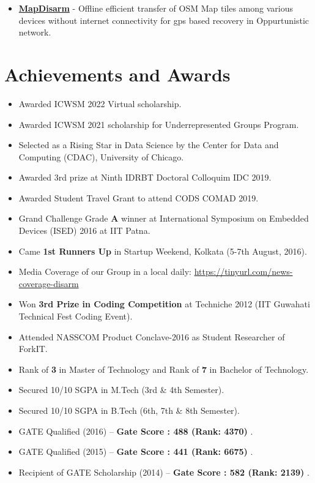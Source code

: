 \documentclass[margin, centered]{res}
\begin{document}
\begin{resume}
\begin{itemize}[leftmargin=*]
 \item \textbf{\href{https://github.com/hridaydutta123/MapDisarm}{MapDisarm}} - Offline efficient transfer of OSM Map tiles among various devices without internet connectivity for gps based recovery in Oppurtunistic network.
\end{itemize}

\section{Achievements and Awards}
\begin{itemize}[leftmargin=*]
 \item Awarded ICWSM 2022 Virtual scholarship.
 \item Awarded ICWSM 2021 scholarship for Underrepresented Groups Program.
 \item Selected as a Rising Star in Data Science by the Center for Data and Computing (CDAC), University of Chicago.
 \item Awarded 3rd prize at Ninth IDRBT Doctoral Colloquim IDC 2019.
 \item Awarded Student Travel Grant to attend CODS COMAD 2019.
 \item Grand Challenge Grade \textbf{A} winner at International Symposium on Embedded Devices (ISED) 2016 at IIT Patna.
 \item Came \textbf{1st Runners Up} in Startup Weekend, Kolkata (5-7th August, 2016).
 \item Media Coverage of our Group in a local daily: \url{https://tinyurl.com/news-coverage-disarm}
 \item Won \textbf{3rd Prize in Coding Competition} at Techniche 2012 (IIT Guwahati Technical Fest Coding Event).
 \item Attended NASSCOM Product Conclave-2016 as Student Researcher of ForkIT.
 \item Rank of \textbf{3} in Master of Technology and Rank of \textbf{7} in Bachelor of Technology.
 \item Secured 10/10 SGPA in M.Tech (3rd \& 4th Semester).
 \item Secured 10/10 SGPA in B.Tech (6th, 7th \& 8th Semester).
 \item GATE Qualified (2016) – \textbf{Gate Score : 488 (Rank: 4370) }.
 \item GATE Qualified (2015) – \textbf{Gate Score : 441 (Rank: 6675) }.
 \item Recipient of GATE Scholarship (2014) – \textbf{Gate Score : 582 (Rank: 2139) }.


\end{itemize}
\end{resume}
\end{document}

